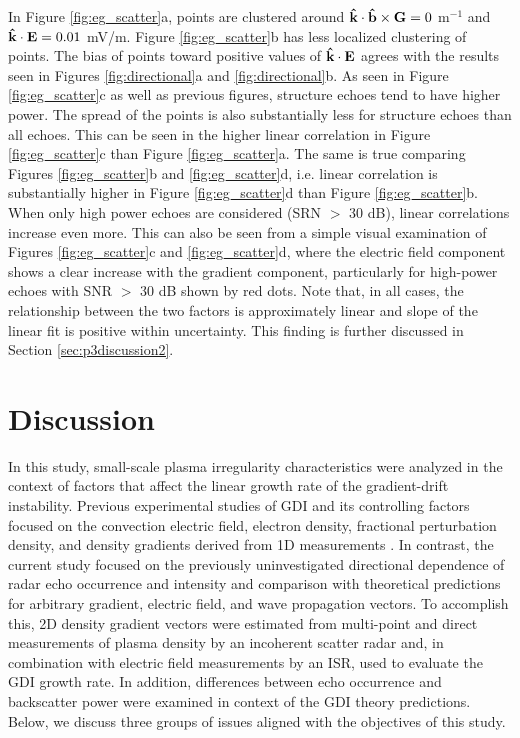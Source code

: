 In Figure \ref{fig:eg_scatter}a, points are clustered around \(\mathbf{\hat{k}}\cdot\mathbf{\hat{b}}\times\mathbf{G} = 0\) m\(^{-1}\) and \(\mathbf{\hat{k}}\cdot\mathbf{E} = 0.01\) mV/m.  Figure \ref{fig:eg_scatter}b has less localized clustering of points.  The bias of points toward positive values of \(\mathbf{\hat{k}}\cdot\mathbf{E}\) agrees with the results seen in Figures \ref{fig:directional}a and \ref{fig:directional}b.  As seen in Figure \ref{fig:eg_scatter}c as well as previous figures, structure echoes tend to have higher power.  The spread of the points is also substantially less for structure echoes than all echoes.  This can be seen in the higher linear correlation in Figure \ref{fig:eg_scatter}c than Figure \ref{fig:eg_scatter}a.  The same is true comparing Figures \ref{fig:eg_scatter}b and \ref{fig:eg_scatter}d, i.e. linear correlation is substantially higher in Figure \ref{fig:eg_scatter}d than Figure \ref{fig:eg_scatter}b. When only high power echoes are considered (SRN \(>\) 30 dB), linear correlations increase even more.  This can also be seen from a simple visual examination of Figures \ref{fig:eg_scatter}c and \ref{fig:eg_scatter}d, where the electric field component shows a clear increase with the gradient component, particularly for high-power echoes with SNR \(>\) 30 dB shown by red dots. Note that, in all cases, the relationship between the two factors is approximately linear and slope of the linear fit is positive within uncertainty. This finding is further discussed in Section \ref{sec:p3discussion2}.




\section{Discussion}
\label{sec:p3discussion}
In this study, small-scale plasma irregularity characteristics were analyzed in the context of factors that affect the linear growth rate of the gradient-drift instability.  Previous experimental studies of GDI and its controlling factors focused on the convection electric field, electron density, fractional perturbation density, and density gradients derived from 1D measurements \citep[e.g.][]{Villain1986,Fukumoto1999,Fukumoto2000,Danskin2002,Oksavik2010,Moen2012,Makarevich2014b,Burston2016}.  In contrast, the current study focused on the previously uninvestigated directional dependence of radar echo occurrence and intensity and comparison with theoretical predictions for arbitrary gradient, electric field, and wave propagation vectors. To accomplish this, 2D density gradient vectors were estimated from multi-point and direct measurements of plasma density by an incoherent scatter radar and, in combination with electric field measurements by an ISR, used to evaluate the GDI growth rate.  In addition, differences between echo occurrence and backscatter power were examined in context of the GDI theory predictions. Below, we discuss three groups of issues aligned with the objectives of this study.



